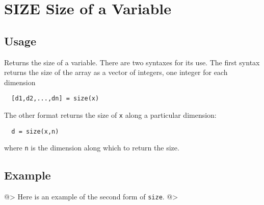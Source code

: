 \section{SIZE Size of a Variable}

\subsection{Usage}

Returns the size of a variable.  There are two syntaxes for its
use.  The first syntax returns the size of the array as a vector
of integers, one integer for each dimension
\begin{verbatim}
  [d1,d2,...,dn] = size(x)
\end{verbatim}
The other format returns the size of \verb|x| along a particular
dimension:
\begin{verbatim}
  d = size(x,n)
\end{verbatim}
where \verb|n| is the dimension along which to return the size.
\subsection{Example}

@>
Here is an example of the second form of \verb|size|.
@>
